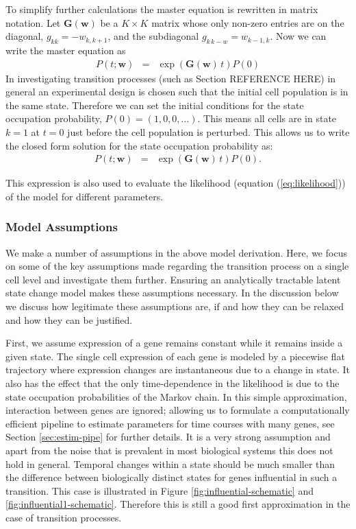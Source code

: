 To simplify further calculations the master equation is rewritten in matrix notation. Let $\mathbf{G}(\mathbf{w})$ be a $K \times K$ matrix whose only non-zero entries are on the diagonal, $g_{kk}=-w_{k,k+1}$, and the subdiagonal $ g_{k\,k-w}=w_{k-1,k}$. Now we can write the master equation as
\begin{eqnarray}
  \label{eq:masterMat}
  P(t; \mathbf{w}) &=& \exp{\left(\mathbf{G}(\mathbf{w})\,t \right) } {P}(0)
\end{eqnarray} %
In investigating transition processes (such as Section REFERENCE HERE) in general an experimental design is chosen such that the initial cell population is in the same state. Therefore we can set the initial conditions for the state occupation probability, $P(0) = (1, 0 , 0, \ldots)$. This means all cells are in state $k=1$ at $t=0$ just before the cell population is perturbed. This allows us to write the closed form solution for the state occupation probability as:
\begin{eqnarray}
  \label{eq:state-occ}
  P(t; \mathbf{w}) &= & \exp{\left(\mathbf{G}(\mathbf{w})\,t \right) } {P}(0).
\end{eqnarray}

This expression is also used to evaluate the likelihood (equation (\ref{eq:likelihood})) of the model for different parameters.

\subsubsection{Model Assumptions}
\label{sec:model-assumptions}

We make a number of assumptions in the above model derivation. Here, we focus on some of the key assumptions made regarding the transition process on a single cell level and investigate them further. Ensuring an analytically tractable latent state change model makes these assumptions necessary. In the discussion below we discuss how legitimate these assumptions are, if and how they can be relaxed and how they can be justified.

First, we assume expression of a gene remains constant while it remains inside a given state. The single cell expression of each gene is modeled by a piecewise flat trajectory where expression changes are instantaneous due to a change in state. It also has the effect that the only time-dependence in the likelihood is due to the state occupation probabilities of the Markov chain. In this simple approximation, interaction between genes are ignored; allowing us to formulate a computationally efficient pipeline to estimate parameters for time courses with many genes, see Section \ref{sec:estim-pipe} for further details. It is a very strong assumption and apart from the noise that is prevalent in most biological systems
this does not hold in general. Temporal changes within a state should be much smaller than the difference between biologically distinct states for genes influential in such a transition. This case is illustrated in Figure \ref{fig:influential-schematic} and \ref{fig:influential1-schematic}. Therefore this is still a good first approximation in the case of transition processes. 

